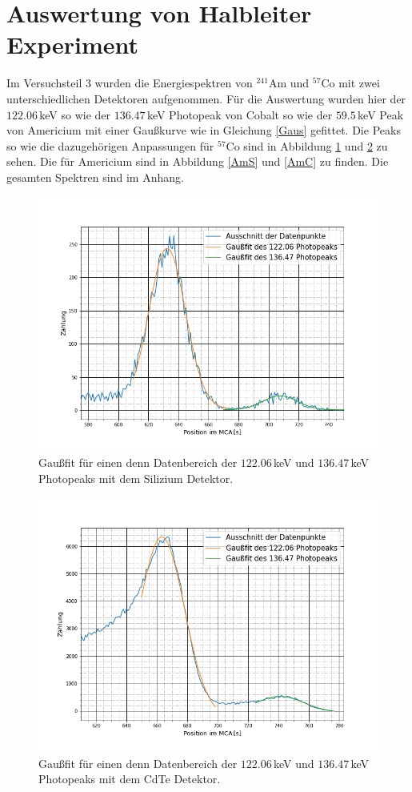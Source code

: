 \section{Auswertung von Halbleiter Experiment}
Im Versuchsteil 3 wurden die Energiespektren von $^{241}$Am und $^{57}$Co mit zwei unterschiedlichen Detektoren aufgenommen. Für die Auswertung wurden hier der $122.06\,$keV so wie der $136.47\,$keV Photopeak von Cobalt so wie der $59.5\,$keV Peak von Americium mit einer Gaußkurve wie in Gleichung \ref{Gaus} gefittet. Die Peaks so wie die dazugehörigen Anpassungen für $^{57}$Co sind in Abbildung \ref{CoS} und \ref{CoC} zu sehen. Die für Americium sind in Abbildung \ref{AmS} und \ref{AmC} zu finden. Die gesamten Spektren sind im Anhang.\par
\begin{figure}[ht]
	\includegraphics[scale=0.5]{Bild/CS.png}
	\centering
	\caption[V3 $122.06\,$keV und $136.47\,$keV Peaks mit Silizium Detektor]{Gaußfit für einen denn Datenbereich der $122.06\,$keV und $136.47\,$keV Photopeaks mit dem Silizium Detektor.}
	\label{CoS}
\end{figure}
\begin{figure}[ht]
	\includegraphics[scale=0.5]{Bild/CC.png}
	\centering
	\caption[V3 $122.06\,$keV und $136.47\,$keV Peaks mit CdTe Detektor]{Gaußfit für einen denn Datenbereich der $122.06\,$keV und $136.47\,$keV Photopeaks mit dem CdTe Detektor.}
	\label{CoC}
\end{figure}
